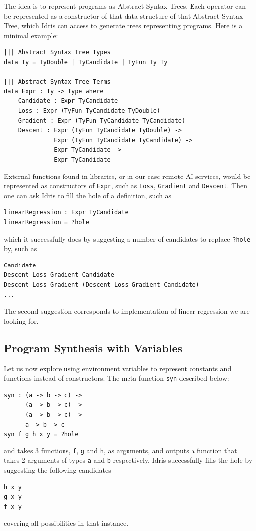 \documentclass[]{report}
\begin{document}
The idea is to represent programs as Abstract Syntax Trees.  Each
operator can be represented as a constructor of that data structure of
that Abstract Syntax Tree, which Idris can access to generate trees
representing programs.  Here is a minimal example:
\begin{verbatim}
||| Abstract Syntax Tree Types
data Ty = TyDouble | TyCandidate | TyFun Ty Ty

||| Abstract Syntax Tree Terms
data Expr : Ty -> Type where
    Candidate : Expr TyCandidate
    Loss : Expr (TyFun TyCandidate TyDouble)
    Gradient : Expr (TyFun TyCandidate TyCandidate)
    Descent : Expr (TyFun TyCandidate TyDouble) ->
              Expr (TyFun TyCandidate TyCandidate) ->
              Expr TyCandidate ->
              Expr TyCandidate
\end{verbatim}
External functions found in libraries, or in our case remote AI
services, would be represented as constructors of \texttt{Expr}, such
as \texttt{Loss}, \texttt{Gradient} and \texttt{Descent}.  Then one
can ask Idris to fill the hole of a definition, such as
\begin{verbatim}
linearRegression : Expr TyCandidate
linearRegression = ?hole
\end{verbatim}
which it successfully does by suggesting a number of candidates to
replace \texttt{?hole} by, such as
\begin{verbatim}
Candidate
Descent Loss Gradient Candidate
Descent Loss Gradient (Descent Loss Gradient Candidate)
...
\end{verbatim}
The second suggestion corresponds to implementation of linear
regression we are looking for.

\subsection{Program Synthesis with Variables}

Let us now explore using environment variables to represent constants
and functions instead of constructors.  The meta-function \texttt{syn}
described below:
\begin{verbatim}
syn : (a -> b -> c) ->
      (a -> b -> c) ->
      (a -> b -> c) ->
      a -> b -> c
syn f g h x y = ?hole
\end{verbatim}
and takes 3 functions, \texttt{f}, \texttt{g} and \texttt{h}, as
arguments, and outputs a function that takes 2 arguments of types
\texttt{a} and \texttt{b} respectively.  Idris successfully fills the
hole by suggesting the following candidates
\begin{verbatim}
h x y
g x y
f x y
\end{verbatim}
covering all possibilities in that instance.
\end{document}
